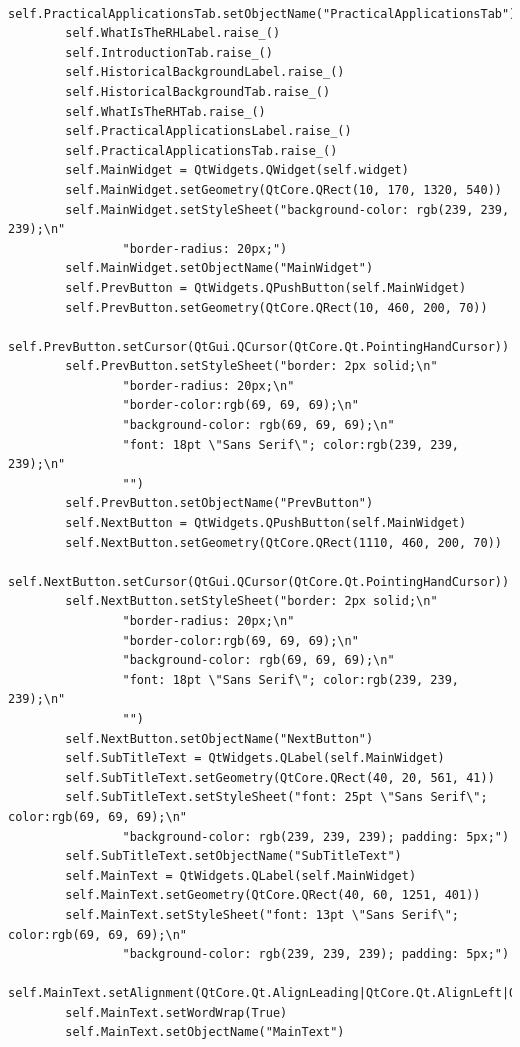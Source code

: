 \documentclass{article}
\begin{document}
\begin{lstlisting}
        self.PracticalApplicationsTab.setObjectName("PracticalApplicationsTab")
        self.WhatIsTheRHLabel.raise_()
        self.IntroductionTab.raise_()
        self.HistoricalBackgroundLabel.raise_()
        self.HistoricalBackgroundTab.raise_()
        self.WhatIsTheRHTab.raise_()
        self.PracticalApplicationsLabel.raise_()
        self.PracticalApplicationsTab.raise_()
        self.MainWidget = QtWidgets.QWidget(self.widget)
        self.MainWidget.setGeometry(QtCore.QRect(10, 170, 1320, 540))
        self.MainWidget.setStyleSheet("background-color: rgb(239, 239, 239);\n"
                "border-radius: 20px;")
        self.MainWidget.setObjectName("MainWidget")
        self.PrevButton = QtWidgets.QPushButton(self.MainWidget)
        self.PrevButton.setGeometry(QtCore.QRect(10, 460, 200, 70))
        self.PrevButton.setCursor(QtGui.QCursor(QtCore.Qt.PointingHandCursor))
        self.PrevButton.setStyleSheet("border: 2px solid;\n"
                "border-radius: 20px;\n"
                "border-color:rgb(69, 69, 69);\n"
                "background-color: rgb(69, 69, 69);\n"
                "font: 18pt \"Sans Serif\"; color:rgb(239, 239, 239);\n"
                "")
        self.PrevButton.setObjectName("PrevButton")
        self.NextButton = QtWidgets.QPushButton(self.MainWidget)
        self.NextButton.setGeometry(QtCore.QRect(1110, 460, 200, 70))
        self.NextButton.setCursor(QtGui.QCursor(QtCore.Qt.PointingHandCursor))
        self.NextButton.setStyleSheet("border: 2px solid;\n"
                "border-radius: 20px;\n"
                "border-color:rgb(69, 69, 69);\n"
                "background-color: rgb(69, 69, 69);\n"
                "font: 18pt \"Sans Serif\"; color:rgb(239, 239, 239);\n"
                "")
        self.NextButton.setObjectName("NextButton")
        self.SubTitleText = QtWidgets.QLabel(self.MainWidget)
        self.SubTitleText.setGeometry(QtCore.QRect(40, 20, 561, 41))
        self.SubTitleText.setStyleSheet("font: 25pt \"Sans Serif\"; color:rgb(69, 69, 69);\n"
                "background-color: rgb(239, 239, 239); padding: 5px;")
        self.SubTitleText.setObjectName("SubTitleText")
        self.MainText = QtWidgets.QLabel(self.MainWidget)
        self.MainText.setGeometry(QtCore.QRect(40, 60, 1251, 401))
        self.MainText.setStyleSheet("font: 13pt \"Sans Serif\"; color:rgb(69, 69, 69);\n"
                "background-color: rgb(239, 239, 239); padding: 5px;")
        self.MainText.setAlignment(QtCore.Qt.AlignLeading|QtCore.Qt.AlignLeft|QtCore.Qt.AlignTop)
        self.MainText.setWordWrap(True)
        self.MainText.setObjectName("MainText")

\end{lstlisting}
\end{document}
